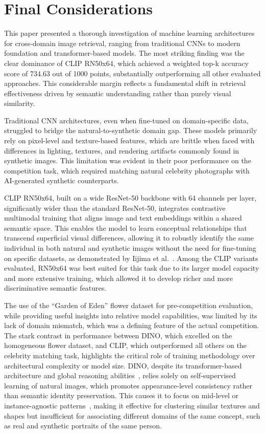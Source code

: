 \section{Final Considerations}

This paper presented a thorough investigation of machine learning architectures for cross-domain image retrieval, ranging from traditional CNNs to modern foundation and transformer-based models. The most striking finding was the clear dominance of CLIP RN50x64, which achieved a weighted top-k accuracy score of 734.63 out of 1000 points, substantially outperforming all other evaluated approaches. This considerable margin reflects a fundamental shift in retrieval effectiveness driven by semantic understanding rather than purely visual similarity.

Traditional CNN architectures, even when fine-tuned on domain-specific data, struggled to bridge the natural-to-synthetic domain gap. These models primarily rely on pixel-level and texture-based features, which are brittle when faced with differences in lighting, textures, and rendering artifacts commonly found in synthetic images. This limitation was evident in their poor performance on the competition task, which required matching natural celebrity photographs with AI-generated synthetic counterparts.

CLIP RN50x64, built on a wide ResNet-50 backbone with 64 channels per layer, significantly wider than the standard ResNet-50, integrates contrastive multimodal training that aligns image and text embeddings within a shared semantic space. This enables the model to learn conceptual relationships that transcend superficial visual differences, allowing it to robustly identify the same individual in both natural and synthetic images without the need for fine-tuning on specific datasets, as demonstrated by Iijima et al.~\cite{iijima2024multimodal}. Among the CLIP variants evaluated, RN50x64 was best suited for this task due to its larger model capacity and more extensive training, which allowed it to develop richer and more discriminative semantic features.

The use of the “Garden of Eden” flower dataset for pre-competition evaluation, while providing useful insights into relative model capabilities, was limited by its lack of domain mismatch, which was a defining feature of the actual competition. The stark contrast in performance between DINO, which excelled on the homogeneous flower dataset, and CLIP, which outperformed all others on the celebrity matching task, highlights the critical role of training methodology over architectural complexity or model size. DINO, despite its transformer-based architecture and global reasoning abilities~\cite{caron2021emerging}, relies solely on self-supervised learning of natural images, which promotes appearance-level consistency rather than semantic identity preservation. This causes it to focus on mid-level or instance-agnostic patterns~\cite{amir2021deep}, making it effective for clustering similar textures and shapes but insufficient for associating different domains of the same concept, such as real and synthetic portraits of the same person.

